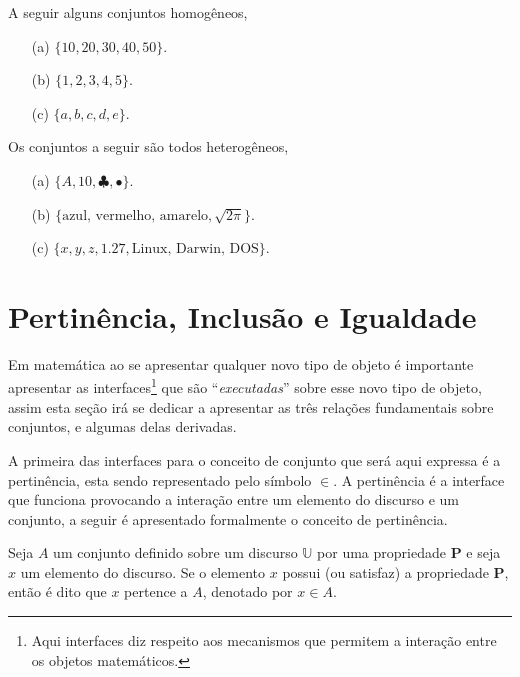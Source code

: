 \begin{exemplo}\label{exe:ConjuntoHomogeneo1}
  A seguir alguns conjuntos homogêneos, 
  \begin{itemize}
    \item[(a)] $\{10, 20, 30, 40, 50\}$.
    \item[(b)] $\{1, 2, 3, 4, 5\}$.
    \item[(c)] $\{a, b, c, d, e\}$.
  \end{itemize}
\end{exemplo}

\begin{exemplo}\label{exe¨ConjuntoHeterogeneo1}
  Os conjuntos a seguir são todos heterogêneos,
  \begin{itemize}
    \item[(a)] $\{A, 10, \clubsuit, \bullet\}$.
    \item[(b)] $\{\text{azul, vermelho, amarelo}, \sqrt{2\pi}\}$.
    \item[(c)] $\{x, y, z, 1.27, \text{Linux, Darwin, DOS}\}$.
  \end{itemize}
\end{exemplo}

\section{Pertinência, Inclusão e Igualdade}\label{sec:RelacoesFundamentais}

Em matemática ao se apresentar qualquer novo tipo de objeto é importante apresentar as interfaces\footnote{Aqui interfaces diz respeito aos mecanismos que permitem a interação entre os objetos matemáticos.} que são ``\textit{executadas}'' sobre esse novo tipo de objeto, assim esta seção irá se dedicar a apresentar as três relações fundamentais sobre conjuntos, e algumas delas derivadas. 

A primeira das interfaces para o conceito de conjunto que será aqui expressa é a pertinência, esta sendo representado pelo símbolo $\in$. A pertinência é a interface que funciona provocando a interação entre um elemento do discurso e um conjunto, a seguir é apresentado formalmente o conceito de pertinência.

\begin{definicao}[Pertinência]\label{def:Pertinencia}
  Seja $A$ um conjunto definido sobre um discurso $\mathbb{U}$ por uma propriedade $\textbf{P}$ e seja $x$ um elemento do discurso. Se o elemento $x$ possui (ou satisfaz) a propriedade $\textbf{P}$, então é dito que $x$ pertence a $A$, denotado por $x \in A$.
\end{definicao}

